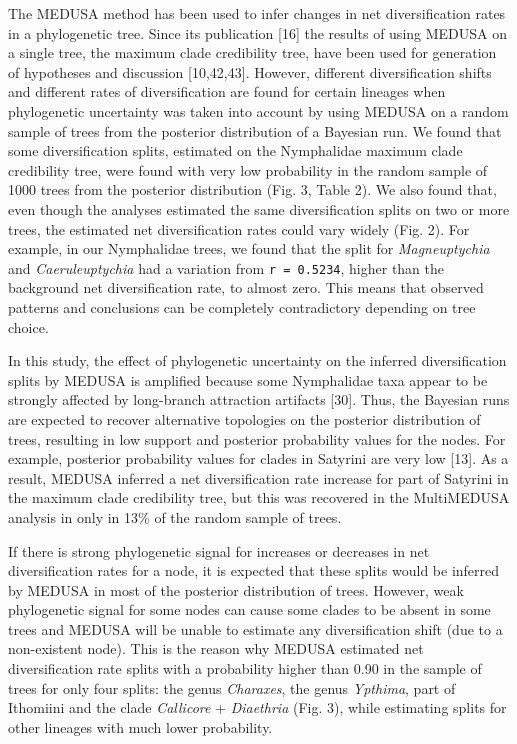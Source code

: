 \documentclass[10pt]{article}
\begin{document}
The MEDUSA method has been used to infer changes in net diversification
rates in a phylogenetic tree. Since its publication {[}16{]} the results
of using MEDUSA on a single tree, the maximum clade credibility tree,
have been used for generation of hypotheses and discussion
{[}10,42,43{]}. However, different diversification shifts and different
rates of diversification are found for certain lineages when
phylogenetic uncertainty was taken into account by using MEDUSA on a
random sample of trees from the posterior distribution of a Bayesian
run. We found that some diversification splits, estimated on the
Nymphalidae maximum clade credibility tree, were found with very low
probability in the random sample of 1000 trees from the posterior
distribution (Fig. 3, Table 2). We also found that, even though the
analyses estimated the same diversification splits on two or more trees,
the estimated net diversification rates could vary widely (Fig. 2). For
example, in our Nymphalidae trees, we found that the split for
\emph{Magneuptychia} and \emph{Caeruleuptychia} had a variation from
\texttt{r = 0.5234}, higher than the background net diversification
rate, to almost zero. This means that observed patterns and conclusions
can be completely contradictory depending on tree choice.

In this study, the effect of phylogenetic uncertainty on the inferred
diversification splits by MEDUSA is amplified because some Nymphalidae
taxa appear to be strongly affected by long-branch attraction artifacts
{[}30{]}. Thus, the Bayesian runs are expected to recover alternative
topologies on the posterior distribution of trees, resulting in low
support and posterior probability values for the nodes. For example,
posterior probability values for clades in Satyrini are very low
{[}13{]}. As a result, MEDUSA inferred a net diversification rate
increase for part of Satyrini in the maximum clade credibility tree, but
this was recovered in the MultiMEDUSA analysis in only in 13\% of the
random sample of trees.

If there is strong phylogenetic signal for increases or decreases in net
diversification rates for a node, it is expected that these splits would
be inferred by MEDUSA in most of the posterior distribution of trees.
However, weak phylogenetic signal for some nodes can cause some clades
to be absent in some trees and MEDUSA will be unable to estimate any
diversification shift (due to a non-existent node). This is the reason
why MEDUSA estimated net diversification rate splits with a probability
higher than 0.90 in the sample of trees for only four splits: the genus
\emph{Charaxes}, the genus \emph{Ypthima}, part of Ithomiini and the
clade \emph{Callicore} + \emph{Diaethria} (Fig. 3), while estimating
splits for other lineages with much lower probability.
\end{document}

